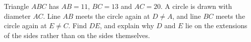 Triangle $ABC$ has $AB=11$, $BC=13$ and $AC=20$. A circle is drawn with diameter $AC$. Line $AB$ meets the circle again at $D\ne A$, and line $BC$ meets the circle again at $E\ne C$. Find $DE$, and explain why $D$ and $E$ lie on the extensions of the sides rather than on the sides themselves.
